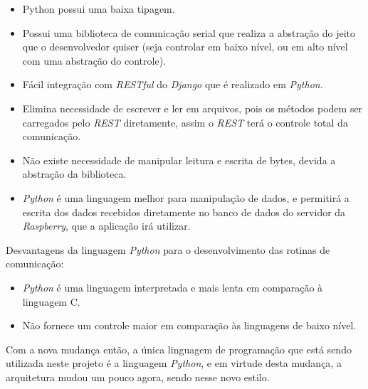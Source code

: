\begin{itemize}
    \item Python possui uma baixa tipagem.
    \item Possui uma biblioteca de comunicação serial que realiza a abstração do jeito que o desenvolvedor quiser (seja controlar em baixo nível, ou em alto nível com uma abstração do controle).
    \item Fácil integração com \textit{RESTful} do \textit{Django} que é realizado em \textit{Python}.
    \item Elimina necessidade de escrever e ler em arquivos, pois os métodos podem ser carregados pelo \textit{REST} diretamente, assim o \textit{REST} terá o controle total da comunicação.
    \item Não existe necessidade de manipular leitura e escrita de bytes, devida a abstração da biblioteca.
    \item \textit{Python} é uma linguagem melhor para manipulação de dados, e permitirá a escrita dos dados recebidos diretamente no banco de dados do servidor da \textit{Raspberry}, que a aplicação irá utilizar.
\end{itemize}

Desvantagens da linguagem \textit{Python} para o desenvolvimento das rotinas de comunicação:

\begin{itemize}
    \item \textit{Python} é uma linguagem interpretada e mais lenta em comparação à linguagem C.
    \item Não fornece um controle maior em comparação às linguagens de baixo nível.
\end{itemize}

Com a nova mudança então, a única linguagem de programação que está sendo utilizada neste projeto é a linguagem \textit{Python}, e em virtude 
desta mudança, a arquitetura mudou um pouco agora, sendo nesse novo estilo.

